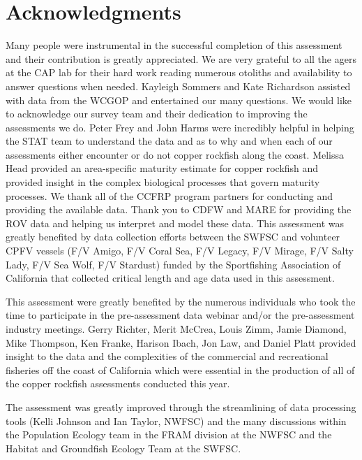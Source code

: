\documentclass[11pt,
  english,
  letterpaper,
]{article}
\begin{document}
\hypertarget{acknowledgments}{%
\section{Acknowledgments}\label{acknowledgments}}

Many people were instrumental in the successful completion of this assessment and their contribution is greatly appreciated. We are very grateful to all the agers at the CAP lab for their hard work reading numerous otoliths and availability to answer questions when needed. Kayleigh Sommers and Kate Richardson assisted with data from the WCGOP and entertained our many questions. We would like to acknowledge our survey team and their dedication to improving the assessments we do. Peter Frey and John Harms were incredibly helpful in helping the STAT team to understand the data and as to why and when each of our assessments either encounter or do not copper rockfish along the coast. Melissa Head provided an area-specific maturity estimate for copper rockfish and provided insight in the complex biological processes that govern maturity processes. We thank all of the CCFRP program partners for conducting and providing the available data. Thank you to CDFW and MARE for providing the ROV data and helping us interpret and model these data. This assessment was greatly benefited by data collection efforts between the SWFSC and volunteer CPFV vessels (F/V Amigo, F/V Coral Sea, F/V Legacy, F/V Mirage, F/V Salty Lady, F/V Sea Wolf, F/V Stardust) funded by the Sportfishing Association of California that collected critical length and age data used in this assessment.

This assessment were greatly benefited by the numerous individuals who took the time to participate in the pre-assessment data webinar and/or the pre-assessment industry meetings. Gerry Richter, Merit McCrea, Louis Zimm, Jamie Diamond, Mike Thompson, Ken Franke, Harison Ibach, Jon Law, and Daniel Platt provided insight to the data and the complexities of the commercial and recreational fisheries off the coast of California which were essential in the production of all of the copper rockfish assessments conducted this year.

The assessment was greatly improved through the streamlining of data processing tools (Kelli Johnson and Ian Taylor, NWFSC) and the many discussions within the Population Ecology team in the FRAM division at the NWFSC and the Habitat and Groundfish Ecology Team at the SWFSC.

\clearpage
\end{document}
